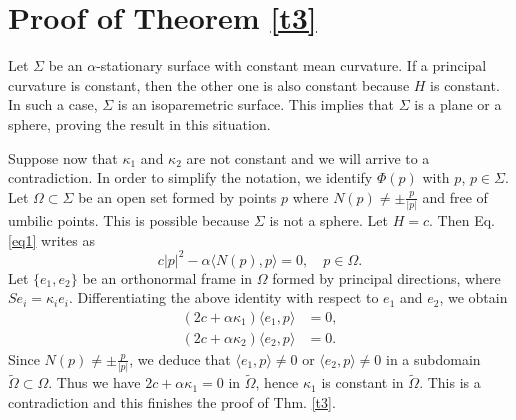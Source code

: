 \documentclass[a4paper,12pt]{amsart}
\theoremstyle{definition}
\begin{document}
\section{Proof of Theorem \ref{t3}}\label{s6}

  Let $\Sigma$  be an $\alpha$-stationary surface with constant mean curvature.  If a principal curvature is constant, then the other one is also constant because $H$ is constant. In such a case, $\Sigma$ is an isoparemetric surface. This implies that $\Sigma$ is   a plane or a sphere, proving the result in this situation. 
  
  Suppose now that $\kappa_1$ and $\kappa_2$ are not constant and we will arrive to a contradiction. In order to simplify the notation, we identify $\Phi(p)$ with $p$, $p\in\Sigma$.  Let  $\Omega\subset\Sigma$ be an open set  formed by points $p$ where $ N(p)\not=\pm \frac{p}{|p|}$ and free of umbilic points.  This is possible because $\Sigma$ is not a sphere. 
Let $H=c$. Then Eq. \eqref{eq1} writes as 
$$c|p|^2-\alpha\langle N(p),p\rangle=0,\quad p\in \Omega.$$
Let $\{e_1,e_2\}$ be an orthonormal frame in $\Omega$ formed by principal directions, where $Se_i=\kappa_i e_i$. 
Differentiating the above identity with respect to $e_1$ and $e_2$, we obtain 
\begin{equation*}
\begin{split}
(2c+\alpha\kappa_1)\langle e_1,p\rangle&=0,\\
(2c+\alpha\kappa_2)\langle e_2,p\rangle&=0.
\end{split}
\end{equation*}
Since $N(p)\not=\pm \frac{p}{|p|}$, we deduce that $\langle e_1,p\rangle\not=0$ or $\langle e_2,p\rangle\not=0$ in a subdomain $\widetilde{\Omega}\subset\Omega$.   Thus   we have $2c+\alpha\kappa_1=0$ in $\widetilde{\Omega}$, hence $\kappa_1$ is constant in $\widetilde{\Omega}$. This is a contradiction and this finishes the proof of Thm. \ref{t3}.  
 
\end{document}
